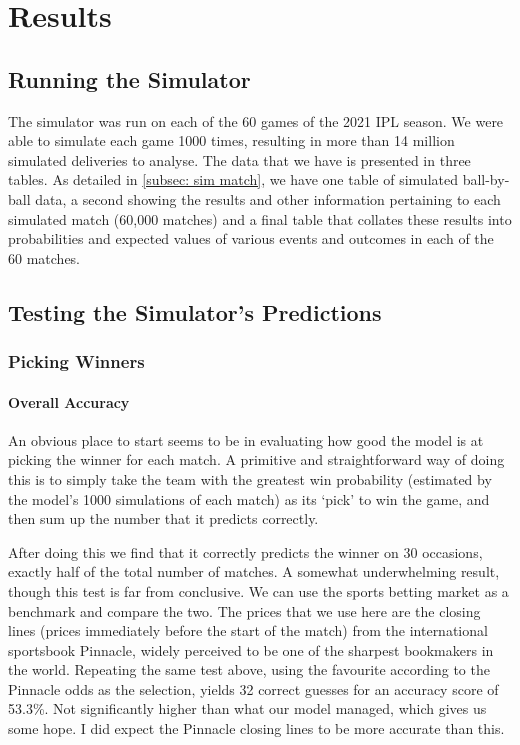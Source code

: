 \titleformat{\chapter}[hang]{\Huge\bfseries}{\thechapter\hsp\textcolor{gray75}{|}\hsp}{0pt}{\Huge\bfseries}
\chapter{Results}

\section{Running the Simulator}

The simulator was run on each of the 60 games of the 2021 IPL season. We were able to simulate each game 1000 times, resulting in more than 14 million simulated deliveries to analyse. The data that we have is presented in three tables. As detailed in \cref{subsec: sim match}, we have one table of simulated ball-by-ball data, a second showing the results and other information pertaining to each simulated match (60,000 matches) and a final table that collates these results into probabilities and expected values of various events and outcomes in each of the 60 matches.

\section{Testing the Simulator's Predictions}

\subsection{Picking Winners}

\subsubsection{Overall Accuracy}

An obvious place to start seems to be in evaluating how good the model is at picking the winner for each match. A primitive and straightforward way of doing this is to simply take the team with the greatest win probability (estimated by the model's 1000 simulations of each match) as its `pick' to win the game, and then sum up the number that it predicts correctly.

After doing this we find that it correctly predicts the winner on 30 occasions, exactly half of the total number of matches. A somewhat underwhelming result, though this test is far from conclusive. We can use the sports betting market as a benchmark and compare the two. The prices that we use here are the closing lines (prices immediately before the start of the match) from the international sportsbook Pinnacle\footnotemark{}, widely perceived to be one of the sharpest bookmakers in the world. \cite{norheim_closing_2017} Repeating the same test above, using the favourite according to the Pinnacle odds as the selection, yields 32 correct guesses for an accuracy score of 53.3\%. Not significantly higher than what our model managed, which gives us some hope. I did expect the Pinnacle closing lines to be more accurate than this.

